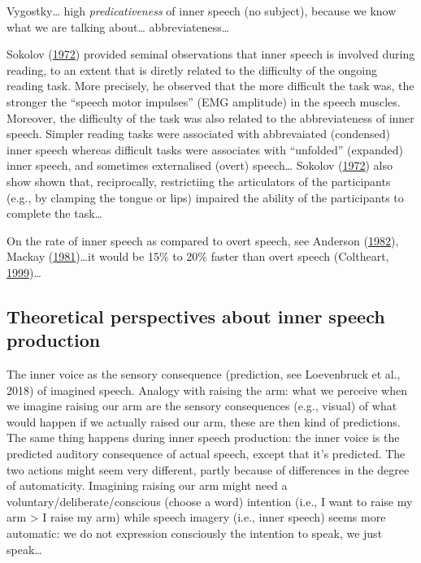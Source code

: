 \documentclass[a4paper,12pt,twoside,openright,oldfontcommands]{memoir}
\begin{document}
Vygostky\ldots{} high \emph{predicativeness} of inner speech (no subject), because we know what we are talking about\ldots{} abbreviateness\ldots{}

Sokolov (\protect\hyperlink{ref-sokolov_inner_1972}{1972}) provided seminal observations that inner speech is involved during reading, to an extent that is diretly related to the difficulty of the ongoing reading task. More precisely, he observed that the more difficult the task was, the stronger the \enquote{speech motor impulses} (EMG amplitude) in the speech muscles. Moreover, the difficulty of the task was also related to the abbreviateness of inner speech. Simpler reading tasks were associated with abbrevaiated (condensed) inner speech whereas difficult tasks were associates with \enquote{unfolded} (expanded) inner speech, and sometimes externalised (overt) speech\ldots{} Sokolov (\protect\hyperlink{ref-sokolov_inner_1972}{1972}) also show shown that, reciprocally, restrictiing the articulators of the participants (e.g., by clamping the tongue or lips) impaired the ability of the participants to complete the task\ldots{}

On the rate of inner speech as compared to overt speech, see Anderson (\protect\hyperlink{ref-anderson_speech_1982}{1982}), Mackay (\protect\hyperlink{ref-mackay_problem_1981}{1981})\ldots it would be 15\% to 20\% faster than overt speech (Coltheart, \protect\hyperlink{ref-coltheart_phonological_1999}{1999})\ldots{}

\hypertarget{theoretical-perspectives-about-inner-speech-production}{%
\subsection{Theoretical perspectives about inner speech production}\label{theoretical-perspectives-about-inner-speech-production}}

The inner voice as the sensory consequence (prediction, see Loevenbruck et al., 2018) of imagined speech. Analogy with raising the arm: what we perceive when we imagine raising our arm are the sensory consequences (e.g., visual) of what would happen if we actually raised our arm, these are then kind of predictions. The same thing happens during inner speech production: the inner voice is the predicted auditory consequence of actual speech, except that it's predicted. The two actions might seem very different, partly because of differences in the degree of automaticity. Imagining raising our arm might need a voluntary/deliberate/conscious (choose a word) intention (i.e., I want to raise my arm \textgreater{} I raise my arm) while speech imagery (i.e., inner speech) seems more automatic: we do not expression consciously the intention to speak, we just speak\ldots{}
\end{document}
